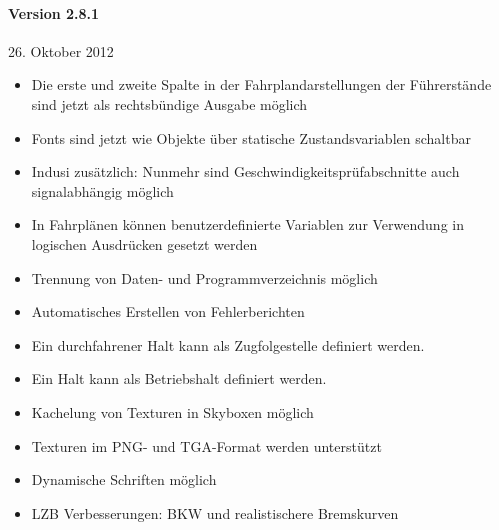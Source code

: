 \paragraph{Version 2.8.1}

26. Oktober 2012

\begin{itemize}
\itemsep1pt\parskip0pt
\item
  Die erste und zweite Spalte in der Fahrplandarstellungen der
  Führerstände sind jetzt als rechtsbündige Ausgabe möglich
\item
  Fonts sind jetzt wie Objekte über statische Zustandsvariablen
  schaltbar
\item
  Indusi zusätzlich: Nunmehr sind Geschwindigkeitsprüfabschnitte auch
  signalabhängig möglich
\item
  In Fahrplänen können benutzerdefinierte Variablen zur Verwendung in
  logischen Ausdrücken gesetzt werden
\item
  Trennung von Daten- und Programmverzeichnis möglich
\item
  Automatisches Erstellen von Fehlerberichten
\item
  Ein durchfahrener Halt kann als Zugfolgestelle definiert werden.
\item
  Ein Halt kann als Betriebshalt definiert werden.
\item
  Kachelung von Texturen in Skyboxen möglich
\item
  Texturen im PNG- und TGA-Format werden unterstützt
\item
  Dynamische Schriften möglich
\item
  LZB Verbesserungen: BKW und realistischere Bremskurven
\end{itemize}


